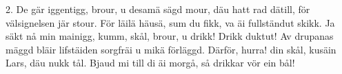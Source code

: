 2.  De gär iggentigg, brour,
    u desamä sägd mour,
    däu hatt rad dätill, för välsignelsen jär stour.
    För läilä häusä, sum du fikk,
    va äi fullständut skikk.
    Ja säkt nå min mainigg, kumm, skål, brour, u drikk!
    Drikk duktut! Av drupanas mäggd
    bläir lifstäiden sorgfräi u mikä förläggd.
    Därför, hurra! din skål,
    kusäin Lars, däu nukk tål.
    Bjaud mi till di äi morgå, så drikkar vör ein bål!
